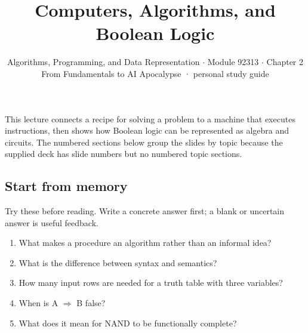\documentclass[11pt]{article}
\title{\sffamily\bfseries\color{FAUblue}Computers, Algorithms, and Boolean Logic}
\author{Algorithms, Programming, and Data Representation \ensuremath{\cdot} Module 92313 \ensuremath{\cdot} Chapter 2\\[2pt]\small From Fundamentals to AI Apocalypse · personal study guide}
\date{}
\begin{document}
\maketitle
\begingroup\footnotesize\setlength{\parskip}{0pt}\tableofcontents\endgroup
\clearpage

{\large This lecture connects a recipe for solving a problem to a machine that executes instructions, then shows how Boolean logic can be represented as algebra and circuits. The numbered sections below group the slides by topic because the supplied deck has slide numbers but no numbered topic sections.}


\begin{keepsection}
\section{Start from memory}

Try these before reading. Write a concrete answer first; a blank or uncertain answer is useful feedback.

\begin{enumerate}
\item What makes a procedure an algorithm rather than an informal idea?
\item What is the difference between syntax and semantics?
\item How many input rows are needed for a truth table with three variables?
\item When is A \ensuremath{\Rightarrow} B false?
\item What does it mean for NAND to be functionally complete?
\end{enumerate}

\end{keepsection}
\end{document}
